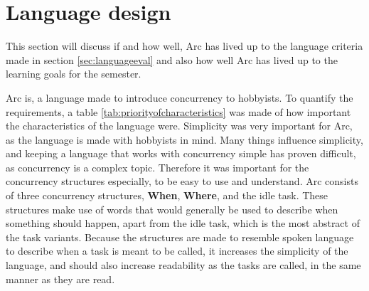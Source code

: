 \section{Language design}

This section will discuss if and how well, Arc has lived up to the language criteria made in section \ref{sec:languageeval} and also how well Arc has lived up to the learning goals for the semester.

Arc is, a language made to introduce concurrency to hobbyists. To quantify the requirements, a table \ref{tab:priorityofcharacteristics} was made of how important the characteristics of the language were.
Simplicity was very important for Arc, as the language is made with hobbyists in mind. Many things influence simplicity, and keeping a language that works with concurrency simple has proven difficult, as concurrency is a complex topic. Therefore it was important for the concurrency structures especially, to be easy to use and understand. Arc consists of three concurrency structures, \textbf{When}, \textbf{Where}, and the idle task. These structures make use of words that would generally be used to describe when something should happen, apart from the idle task, which is the most abstract of the task variants. Because the structures are made to resemble spoken language to describe when a task is meant to be called, it increases the simplicity of the language, and should also increase readability as the tasks are called, in the same manner as they are read. 



